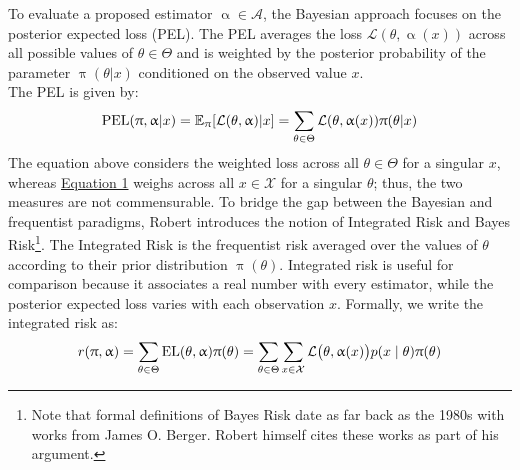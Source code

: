\documentclass[letterpaper,12pt]{article}
\newcommand{\given}{|}
\begin{document}
To evaluate a proposed estimator $\upalpha \in \mathcal{A}$, the Bayesian approach focuses on the posterior expected loss (PEL). The PEL averages the loss $\mathcal{L}(\theta, \upalpha(x))$ across all possible values of $\theta \in \Theta$ and is weighted by the posterior probability of the parameter $\uppi(\theta \given x)$ conditioned on the observed value $x$. \\ The PEL is given by: \vspace{-0.5cm}
\begin{equation}
	\text{PEL}(\uppi, \upalpha \given x) = \mathbb{E}_{\uppi}[\mathcal{L}(\theta, \upalpha)\given x] = \sum_{\theta \in \Theta} \mathcal{L}(\theta, \upalpha(x)) \uppi(\theta \given x) \label{eq:PEL} \vspace{-0.25cm}
\end{equation} 
The equation above considers the weighted loss across all $\theta \in \Theta$ for a singular $x$, whereas \hyperref[eq:EL]{Equation 1} weighs across all $x \in \mathcal{X}$ for a singular $\theta$; thus, the two measures are not commensurable. To bridge the gap between the Bayesian and frequentist paradigms, Robert introduces the notion of Integrated Risk and Bayes Risk\footnote{Note that formal definitions of Bayes Risk date as far back as the 1980s with works from James O. Berger\cite{berger1985}. Robert himself cites these works as part of his argument.}. The Integrated Risk is the frequentist risk averaged over the values of $\theta$ according to their prior distribution $\uppi(\theta)$. Integrated risk is useful for comparison because it associates a real number with every estimator, while the posterior expected loss varies with each observation $x$. Formally, we write the integrated risk as: \vspace{-0.25cm}
\begin{equation}
	{r}(\uppi, \upalpha) = \sum_{\theta \in \Theta} \text{EL}(\theta, \upalpha)  \uppi(\theta) = \sum_{\theta \in \Theta}\sum_{x \in \mathcal{X}} \mathcal{L}\big(\theta, \upalpha(x) \big)p(x \mid \theta) \uppi(\theta)  \label{eq:IR}
	\vspace{-0.25cm}
\end{equation}
\end{document}
